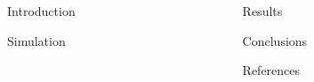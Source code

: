 \begin{frame}[t]{}
	
	\vspace{-20mm}

	\begin{columns}[T]
		\begin{column}{.49\linewidth}
			\begin{block}{Introduction}
				
			\end{block}
			\vspace{-10mm}
			\begin{block}{Simulation}
				
			\end{block}
			\end{column}

			\begin{column}{.49\linewidth}
			\begin{block}{Results}
				
			\end{block}
			\vspace{-10mm}
			\begin{block}{Conclusions}
				
			\end{block}
			\vspace{-10mm}
			\begin{block}{References}
				
			\end{block}
		\end{column}
	\end{columns}
\end{frame}